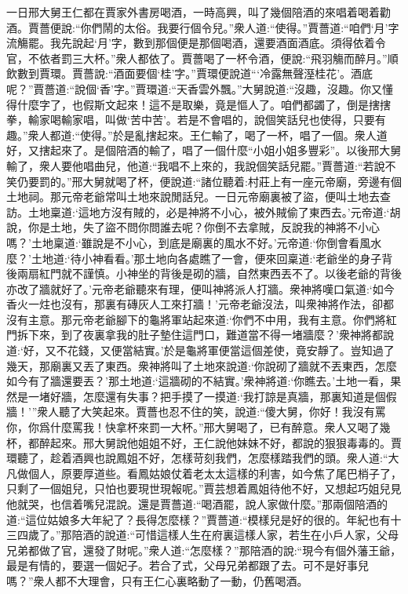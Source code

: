 \begin{parag}
    一日邢大舅王仁都在賈家外書房喝酒，一時高興，叫了幾個陪酒的來唱着喝着勸酒。賈薔便說:“你們鬧的太俗。我要行個令兒。”衆人道:“使得。”賈薔道:“咱們‘月’字流觴罷。我先說起‘月’字，數到那個便是那個喝酒，還要酒面酒底。須得依着令官，不依者罰三大杯。”衆人都依了。賈薔喝了一杯令酒，便說:“飛羽觴而醉月。”順飲數到賈環。賈薔說:“酒面要個‘桂’字。”賈環便說道“‘冷露無聲溼桂花’。酒底呢？”賈薔道:“說個‘香’字。”賈環道:“天香雲外飄。”大舅說道:“沒趣，沒趣。你又懂得什麼字了，也假斯文起來！這不是取樂，竟是慪人了。咱們都蠲了，倒是搳搳拳，輸家喝輸家唱，叫做‘苦中苦’。若是不會唱的，說個笑話兒也使得，只要有趣。”衆人都道:“使得。”於是亂搳起來。王仁輸了，喝了一杯，唱了一個。衆人道好，又搳起來了。是個陪酒的輸了，唱了一個什麼“小姐小姐多豐彩”。以後邢大舅輸了，衆人要他唱曲兒，他道:“我唱不上來的，我說個笑話兒罷。”賈薔道:“若說不笑仍要罰的。”邢大舅就喝了杯，便說道:“諸位聽着:村莊上有一座元帝廟，旁邊有個土地祠。那元帝老爺常叫土地來說閒話兒。一日元帝廟裏被了盜，便叫土地去查訪。土地稟道:‘這地方沒有賊的，必是神將不小心，被外賊偷了東西去。’元帝道:‘胡說，你是土地，失了盜不問你問誰去呢？你倒不去拿賊，反說我的神將不小心嗎？’土地稟道:‘雖說是不小心，到底是廟裏的風水不好。’元帝道:‘你倒會看風水麼？’土地道:‘待小神看看。’那土地向各處瞧了一會，便來回稟道:‘老爺坐的身子背後兩扇紅門就不謹慎。小神坐的背後是砌的牆，自然東西丟不了。以後老爺的背後亦改了牆就好了。’元帝老爺聽來有理，便叫神將派人打牆。衆神將嘆口氣道:‘如今香火一炷也沒有，那裏有磚灰人工來打牆！’元帝老爺沒法，叫衆神將作法，卻都沒有主意。那元帝老爺腳下的龜將軍站起來道:‘你們不中用，我有主意。你們將紅門拆下來，到了夜裏拿我的肚子墊住這門口，難道當不得一堵牆麼？’衆神將都說道:‘好，又不花錢，又便當結實。’於是龜將軍便當這個差使，竟安靜了。豈知過了幾天，那廟裏又丟了東西。衆神將叫了土地來說道:‘你說砌了牆就不丟東西，怎麼如今有了牆還要丟？’那土地道:‘這牆砌的不結實。’衆神將道:‘你瞧去。’土地一看，果然是一堵好牆，怎麼還有失事？把手摸了一摸道:‘我打諒是真牆，那裏知道是個假牆！’”衆人聽了大笑起來。賈薔也忍不住的笑，說道:“傻大舅，你好！我沒有罵你，你爲什麼罵我！快拿杯來罰一大杯。”邢大舅喝了，已有醉意。衆人又喝了幾杯，都醉起來。邢大舅說他姐姐不好，王仁說他妹妹不好，都說的狠狠毒毒的。賈環聽了，趁着酒興也說鳳姐不好，怎樣苛刻我們，怎麼樣踏我們的頭。衆人道:“大凡做個人，原要厚道些。看鳳姑娘仗着老太太這樣的利害，如今焦了尾巴梢子了，只剩了一個姐兒，只怕也要現世現報呢。”賈芸想着鳳姐待他不好，又想起巧姐兒見他就哭，也信着嘴兒混說。還是賈薔道:“喝酒罷，說人家做什麼。”那兩個陪酒的道:“這位姑娘多大年紀了？長得怎麼樣？”賈薔道:“模樣兒是好的很的。年紀也有十三四歲了。”那陪酒的說道:“可惜這樣人生在府裏這樣人家，若生在小戶人家，父母兄弟都做了官，還發了財呢。”衆人道:“怎麼樣？”那陪酒的說:“現今有個外藩王爺，最是有情的，要選一個妃子。若合了式，父母兄弟都跟了去。可不是好事兒嗎？”衆人都不大理會，只有王仁心裏略動了一動，仍舊喝酒。
\end{parag}


